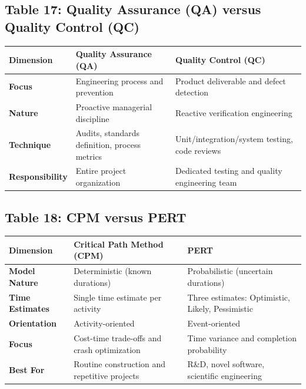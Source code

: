 \subsection*{Table 17: Quality Assurance (QA) versus Quality Control (QC)}
\begin{center}
\small
\begin{tabularx}{\textwidth}{lXX}
\toprule
\textbf{Dimension} & \textbf{Quality Assurance (QA)} & \textbf{Quality Control (QC)} \\
\midrule
\textbf{Focus} & Engineering process and prevention & Product deliverable and defect detection \\
\textbf{Nature} & Proactive managerial discipline & Reactive verification engineering \\
\textbf{Technique} & Audits, standards definition, process metrics & Unit/integration/system testing, code reviews \\
\textbf{Responsibility} & Entire project organization & Dedicated testing and quality engineering team \\
\bottomrule
\end{tabularx}
\end{center}

\subsection*{Table 18: CPM versus PERT}
\begin{center}
\small
\begin{tabularx}{\textwidth}{lXX}
\toprule
\textbf{Dimension} & \textbf{Critical Path Method (CPM)} & \textbf{PERT} \\
\midrule
\textbf{Model Nature} & Deterministic (known durations) & Probabilistic (uncertain durations) \\
\textbf{Time Estimates} & Single time estimate per activity & Three estimates: Optimistic, Likely, Pessimistic \\
\textbf{Orientation} & Activity-oriented & Event-oriented \\
\textbf{Focus} & Cost-time trade-offs and crash optimization & Time variance and completion probability \\
\textbf{Best For} & Routine construction and repetitive projects & R\&D, novel software, scientific engineering \\
\bottomrule
\end{tabularx}
\end{center}

